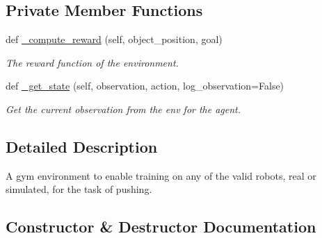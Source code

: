 \subsection*{Private Member Functions}
\begin{DoxyCompactItemize}
\item 
def \hyperlink{classtrifinger__simulation_1_1gym__wrapper_1_1envs_1_1trifinger__push_1_1TriFingerPush_a5dcce1db0f4090f057eaa420d13a58d2}{\+\_\+compute\+\_\+reward} (self, object\+\_\+position, goal)
\begin{DoxyCompactList}\small\item\em The reward function of the environment. \end{DoxyCompactList}\item 
def \hyperlink{classtrifinger__simulation_1_1gym__wrapper_1_1envs_1_1trifinger__push_1_1TriFingerPush_a1ca7fa96ffd63170bad1f341b734b388}{\+\_\+get\+\_\+state} (self, observation, action, log\+\_\+observation=False)
\begin{DoxyCompactList}\small\item\em Get the current observation from the env for the agent. \end{DoxyCompactList}\end{DoxyCompactItemize}


\subsection{Detailed Description}
A gym environment to enable training on any of the valid robots, real or simulated, for the task of pushing. 

\subsection{Constructor \& Destructor Documentation}
\mbox{\label{classtrifinger__simulation_1_1gym__wrapper_1_1envs_1_1trifinger__push_1_1TriFingerPush_aa6c84179b96f31cd9c464598c14cee39}} 
